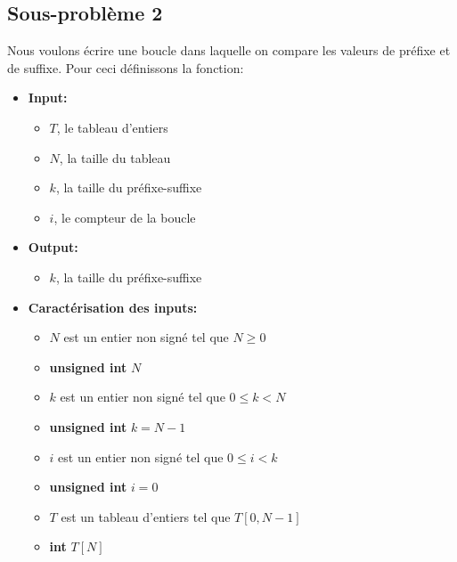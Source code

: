 \subsection{Sous-problème 2}
Nous voulons écrire une boucle dans laquelle on compare les valeurs de préfixe
et de suffixe. Pour ceci définissons la fonction:
\begin{itemize}
   \item \textbf{Input:}
      \begin{itemize}
         \item $T$, le tableau d'entiers
         \item $N$, la taille du tableau
         \item $k$, la taille du préfixe-suffixe
         \item $i$, le compteur de la boucle
      \end{itemize}
   \item \textbf{Output:}
      \begin{itemize}
         \item $k$, la taille du préfixe-suffixe
      \end{itemize}
   \item \textbf{Caractérisation des inputs:}
      \begin{itemize}
         \item $N$ est un entier non signé tel que $N \geq 0$
         \item \textbf{unsigned int} $N$
         \item $k$ est un entier non signé tel que $0 \leq k < N$
         \item \textbf{unsigned int} $k = N - 1$
         \item $i$ est un entier non signé tel que $0 \leq i < k$
         \item \textbf{unsigned int} $i = 0$
         \item $T$ est un tableau d'entiers tel que $T[0, N-1]$
         \item \textbf{int} $T[N]$
      \end{itemize}
\end{itemize}
%
%
%
%
%

